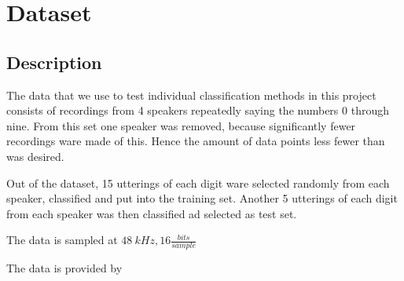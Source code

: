 \chapter{Dataset}
\section{Description}
The data that we use to test individual classification methods in this project consists of recordings from 4 speakers repeatedly saying the numbers 0 through nine.
From this set one speaker was removed, because significantly fewer recordings ware made of this.
Hence the amount of data points less fewer than was desired.

Out of the dataset, 15 utterings of each digit ware selected randomly from each speaker, classified and put into the training set.
Another 5 utterings of each digit from each speaker was then classified ad selected as test set.

The data is sampled at $ 48\ kHz, 16\frac{bits}{sample}  $

The data is provided by \cite{DataSet}

